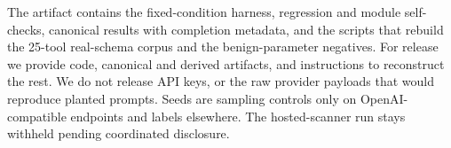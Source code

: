 \documentclass[letterpaper,twocolumn,10pt]{article}
\begin{document}
The artifact contains the fixed-condition harness, regression and module
self-checks, canonical results with completion metadata, and the scripts that
rebuild the 25-tool real-schema corpus and the benign-parameter negatives. For
release we provide code, canonical and derived artifacts, and instructions to
reconstruct the rest. We do not release API keys, or the raw provider payloads
that would reproduce planted prompts. Seeds are sampling controls only on
OpenAI-compatible endpoints and labels elsewhere. The hosted-scanner run stays
withheld pending coordinated disclosure.

{\small


}
\end{document}
